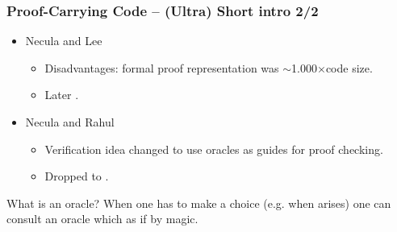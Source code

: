 \documentclass[slidestop,compress,mathserif, xcolor=table]{beamer}
\begin{document}
\begin{frame}
  \frametitle{Proof-Carrying Code -- (Ultra) Short intro 2/2}



  \begin{itemize}
  \item Necula and Lee
    \begin{itemize}
    \item Disadvantages: formal proof representation was $\sim$1.000$\times$code size.
    \item Later .
    \end{itemize}

  \item Necula and Rahul \cite{nera2001}
    \begin{itemize}
    \item Verification idea changed to use oracles as guides for proof checking.
    \item Dropped to .
    \end{itemize}
  \end{itemize}
  
  \begin{block}{What is an oracle?}
    When one has to make a choice (e.g. when  arises) one can
    consult an oracle which  as if by
    magic.
  \end{block}

  
\end{frame}
\end{document}
